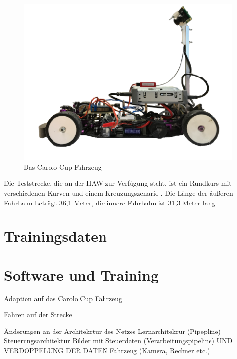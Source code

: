 \begin{figure}[h]
	\centering
	\includegraphics[scale=0.3]{figures/Fahrzeug.png}
	\caption{Das Carolo-Cup Fahrzeug}
	\label{img:Carolo-Fahrzeug}
\end{figure}

Die Teststrecke, die an der HAW zur Verfügung steht, ist ein Rundkurs mit verschiedenen Kurven und einem Kreuzungszenario . Die Länge der äußeren Fahrbahn beträgt 36,1 Meter, die innere Fahrbahn ist 31,3 Meter lang.\\



\section{Trainingsdaten}



\section{Software und Training}


Adaption auf das Carolo Cup Fahrzeug



Fahren auf der Strecke 


Änderungen an der Architekrtur des Netzes
Lernarchitekrur (Pipepline)
Steuerungsarchitektur
Bilder mit Steuerdaten (Verarbeitungspipeline) UND VERDOPPELUNG DER DATEN
Fahrzeug (Kamera, Rechner etc.)

